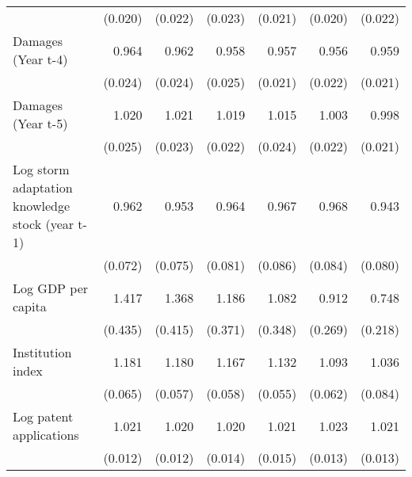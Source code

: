 \begin{table}[htbp]
\begin{tabular}{l*{6}{D{.}{.}{-1}}}
                    &     (0.020)         &     (0.022)         &     (0.023)         &     (0.021)         &     (0.020)         &     (0.022)         \\
\addlinespace
Damages (Year t-4)  &       0.964         &       0.962         &       0.958         &       0.957\sym{**} &       0.956\sym{*}  &       0.959\sym{*}  \\
                    &     (0.024)         &     (0.024)         &     (0.025)         &     (0.021)         &     (0.022)         &     (0.021)         \\
\addlinespace
Damages (Year t-5)  &       1.020         &       1.021         &       1.019         &       1.015         &       1.003         &       0.998         \\
                    &     (0.025)         &     (0.023)         &     (0.022)         &     (0.024)         &     (0.022)         &     (0.021)         \\
\addlinespace
Log storm adaptation knowledge stock (year t-1)&       0.962         &       0.953         &       0.964         &       0.967         &       0.968         &       0.943         \\
                    &     (0.072)         &     (0.075)         &     (0.081)         &     (0.086)         &     (0.084)         &     (0.080)         \\
\addlinespace
Log GDP per capita  &       1.417         &       1.368         &       1.186         &       1.082         &       0.912         &       0.748         \\
                    &     (0.435)         &     (0.415)         &     (0.371)         &     (0.348)         &     (0.269)         &     (0.218)         \\
\addlinespace
Institution index   &       1.181\sym{***}&       1.180\sym{***}&       1.167\sym{***}&       1.132\sym{**} &       1.093         &       1.036         \\
                    &     (0.065)         &     (0.057)         &     (0.058)         &     (0.055)         &     (0.062)         &     (0.084)         \\
\addlinespace
Log patent applications&       1.021\sym{*}  &       1.020         &       1.020         &       1.021         &       1.023\sym{*}  &       1.021         \\
                    &     (0.012)         &     (0.012)         &     (0.014)         &     (0.015)         &     (0.013)         &     (0.013)         \\

\end{tabular}
\end{table}
